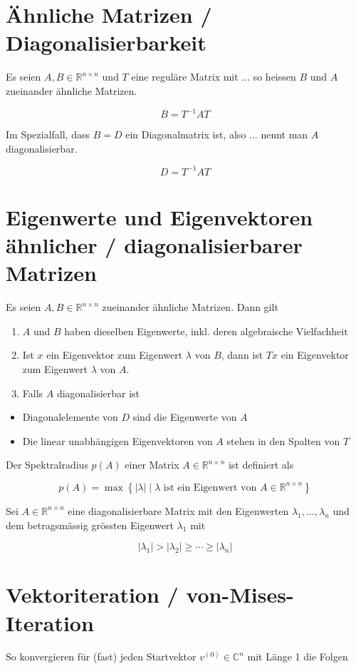 \documentclass[10pt]{article}
\begin{document}
\section*{Ähnliche Matrizen / Diagonalisierbarkeit}
Es seien $A, B \in \mathbb{R}^{n \times n}$ und $T$ eine reguläre Matrix mit ... so heissen $B$ und $A$ zueinander ähnliche Matrizen.

$$
B=T^{-1} A T
$$

Im Spezialfall, dass $B=D$ ein Diagonalmatrix ist, also ... nennt man $A$ diagonalisierbar.

$$
D=T^{-1} A T
$$

\section*{Eigenwerte und Eigenvektoren ähnlicher / diagonalisierbarer Matrizen}
Es seien $A, B \in \mathbb{R}^{n \times n}$ zueinander ähnliche Matrizen. Dann gilt

\begin{enumerate}
  \item $A$ und $B$ haben dieselben Eigenwerte, inkl. deren algebraische Vielfachheit
  \item Ist $x$ ein Eigenvektor zum Eigenwert $\lambda$ von $B$, dann ist $T x$ ein Eigenvektor zum Eigenwert $\lambda$ von $A$.
  \item Falls $A$ diagonalisierbar ist
\end{enumerate}

\begin{itemize}
  \item Diagonalelemente von $D$ sind die Eigenwerte von $A$
  \item Die linear unabhängigen Eigenvektoren von $A$ stehen in den Spalten von $T$
\end{itemize}

Der Spektralradius $p(A)$ einer Matrix $A \in \mathbb{R}^{n \times n}$ ist definiert als

$$
p(A)=\max \left\{|\lambda| \mid \lambda \text { ist ein Eigenwert von } A \in \mathbb{R}^{n \times n}\right\}
$$

Sei $A \in \mathbb{R}^{n \times n}$ eine diagonalisierbare Matrix mit den Eigenwerten $\lambda_{1}, \ldots, \lambda_{n}$ und dem betragsmässig grössten Eigenwert $\lambda_{1}$ mit

$$
\left|\lambda_{1}\right|>\left|\lambda_{2}\right| \geq \cdots \geq\left|\lambda_{n}\right|
$$

\section*{Vektoriteration / von-Mises-Iteration}
So konvergieren für (fast) jeden Startvektor $v^{(0)} \in \mathbb{C}^{n}$ mit Länge 1 die Folgen
\end{document}
